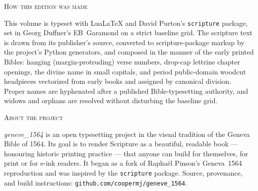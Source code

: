 
\medskip
{\booktitlefont\scshape How this edition was made}\par
This volume is typeset with LuaLaTeX and David Purton's \texttt{scripture}
package, set in Georg Duffner's EB~Garamond on a strict baseline grid. The
scripture text is drawn from its publisher's source, converted to
scripture-package markup by the project's Python generators, and composed in the
manner of the early printed Bibles: hanging (margin-protruding) verse numbers,
drop-cap lettrine chapter openings, the divine name in small capitals, and
period public-domain woodcut headpieces vectorized from early books and assigned
by canonical division. Proper names are hyphenated after a published
Bible-typesetting authority, and widows and orphans are resolved without
disturbing the baseline grid.

\medskip
{\booktitlefont\scshape About the project}\par
\emph{geneve\_1564} is an open typesetting project in the visual tradition of the
Geneva Bible of 1564. Its goal is to render Scripture as a beautiful, readable
book --- honouring historic printing practice --- that anyone can build for
themselves, for print or for e-ink readers. It began as a fork of Rapha\"el
Pinson's Geneva~1564 reproduction and was inspired by the \texttt{scripture}
package. Source, provenance, and build instructions:
\texttt{github.com/coopermj/geneve\_1564}.
